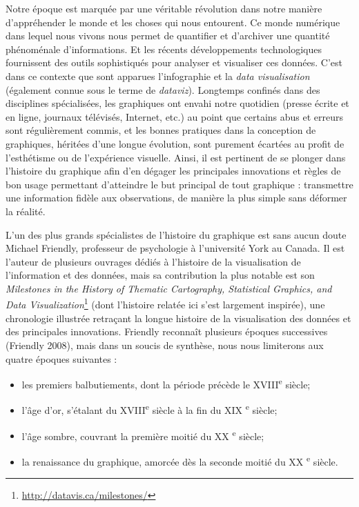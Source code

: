 \documentclass[]{article}
\providecommand{\tightlist}{%
  \setlength{\itemsep}{0pt}\setlength{\parskip}{0pt}}
\begin{document}
Notre époque est marquée par une véritable révolution dans notre manière d'appréhender le monde et les choses qui nous entourent. Ce monde numérique dans lequel nous vivons nous permet de quantifier et d'archiver une quantité phénoménale d'informations. Et les récents développements technologiques fournissent des outils sophistiqués pour analyser et visualiser ces données. C'est dans ce contexte que sont apparues l'infographie et la \emph{data visualisation} (également connue sous le terme de \emph{dataviz}). Longtemps confinés dans des disciplines spécialisées, les graphiques ont envahi notre quotidien (presse écrite et en ligne, journaux télévisés, Internet, etc.) au point que certains abus et erreurs sont régulièrement commis, et les bonnes pratiques dans la conception de graphiques, héritées d'une longue évolution, sont purement écartées au profit de l'esthétisme ou de l'expérience visuelle. Ainsi, il est pertinent de se plonger dans l'histoire du graphique afin d'en dégager les principales innovations et règles de bon usage permettant d'atteindre le but principal de tout graphique : transmettre une information fidèle aux observations, de manière la plus simple sans déformer la réalité.

L'un des plus grands spécialistes de l'histoire du graphique est sans aucun doute Michael Friendly, professeur de psychologie à l'université York au Canada. Il est l'auteur de plusieurs ouvrages dédiés à l'histoire de la visualisation de l'information et des données, mais sa contribution la plus notable est son \emph{Milestones in the History of Thematic Cartography, Statistical Graphics, and Data Visualization}\footnote{\url{http://datavis.ca/milestones/}} (dont l'histoire relatée ici s'est largement inspirée), une chronologie illustrée retraçant la longue histoire de la visualisation des données et des principales innovations. Friendly reconnaît plusieurs époques successives (Friendly 2008), mais dans un soucis de synthèse, nous nous limiterons aux quatre époques suivantes :

\begin{itemize}
\tightlist
\item
  les premiers balbutiements, dont la période précède le XVIII\textsuperscript{e} siècle;
\item
  l'âge d'or, s'étalant du XVIII\textsuperscript{e} siècle à la fin du XIX \textsuperscript{e} siècle;
\item
  l'âge sombre, couvrant la première moitié du XX \textsuperscript{e} siècle;
\item
  la renaissance du graphique, amorcée dès la seconde moitié du XX \textsuperscript{e} siècle.
\end{itemize}
\end{document}
